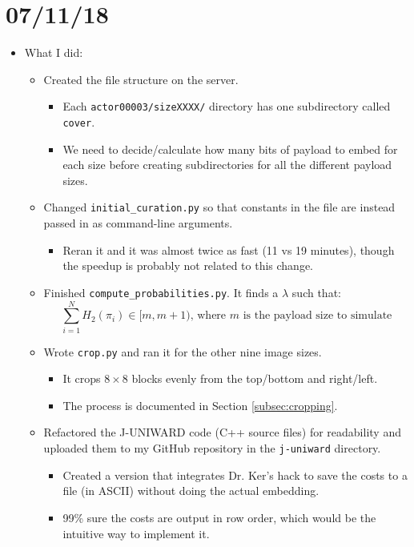 \documentclass[11pt,a4paper]{report}
\begin{document}
\begin{itemize}
\end{itemize}


\section{07/11/18}

\begin{itemize}

\item What I did:
  \begin{itemize}
  \item Created the file structure on the server.
    \begin{itemize}
    \item Each \texttt{actor00003/sizeXXXX/} directory has one subdirectory called \texttt{cover}.
    \item We need to decide/calculate how many bits of payload to embed for each size before creating subdirectories for all the different payload sizes.
    \end{itemize}

  \item Changed \texttt{initial\_curation.py} so that constants in the file are instead passed in as command-line arguments.
    \begin{itemize}
    \item Reran it and it was almost twice as fast (11 vs 19 minutes), though the speedup is probably not related to this change.
    \end{itemize}

  \item Finished \texttt{compute\_probabilities.py}. It finds a $\lambda$ such that:
    \begin{equation*}
    \sum\limits_{i=1}^N H_2(\pi_i) \in [m, m+1)\text{, where $m$ is the payload size to simulate}
    \end{equation*}

  \item Wrote \texttt{crop.py} and ran it for the other nine image sizes.
    \begin{itemize}
    \item It crops $8\times8$ blocks evenly from the top/bottom and right/left.
    \item The process is documented in Section \ref{subsec:cropping}.
    \end{itemize}

  \item Refactored the J-UNIWARD code (C++ source files) for readability and uploaded them to my GitHub repository in the \texttt{j-uniward} directory.
    \begin{itemize}
    \item Created a version that integrates Dr. Ker's hack to save the costs to a file (in ASCII) without doing the actual embedding.
    \item 99\% sure the costs are output in row order, which would be the intuitive way to implement it.
  \end{itemize}


\end{itemize}
\end{itemize}
\end{document}
